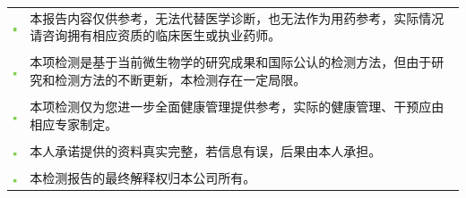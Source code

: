 \documentclass[a4paper, 10pt, notitlepage, oneside , twoside ]{article}
\newcommand*{\lantxh}{\CJKfamily{zhltxh}}
\begin{document}
\fontsize{9pt}{12pt}\selectfont
\color{gray2}
\vspace*{1.6cm}
\lantxh
\hfill
\begin{minipage}{.55\textwidth}
\tabcolsep=2mm
\begin{flushleft}
\begin{longtable}{p{0.1cm}p{7.2cm}}
\includegraphics{xiaofangkuai.pdf} & 本报告内容仅供参考，无法代替医学诊断，也无法作为用药参考，实际情况请咨询拥有相应资质的临床医生或执业药师。\\
 & \\
\includegraphics{xiaofangkuai.pdf} & 本项检测是基于当前微生物学的研究成果和国际公认的检测方法，但由于研究和检测方法的不断更新，本检测存在一定局限。\\
 & \\
\includegraphics{xiaofangkuai.pdf} & 本项检测仅为您进一步全面健康管理提供参考，实际的健康管理、干预应由相应专家制定。\\
 & \\
\includegraphics{xiaofangkuai.pdf} & 本人承诺提供的资料真实完整，若信息有误，后果由本人承担。\\
 & \\
\includegraphics{xiaofangkuai.pdf} & 本检测报告的最终解释权归本公司所有。\\
\end{longtable}
\end{flushleft}
\end{minipage}
\end{document}

